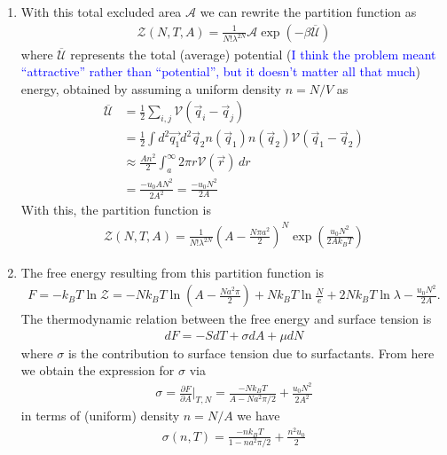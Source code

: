 \documentclass{article}
\theoremstyle{definition}
\newcommand{\p}{\partial}
\newcommand{\be}{\beta}
\newcommand{\f}[2]{\frac{#1}{#2}}
\newcommand{\lp}{\left(}
\newcommand{\rp}{\right)}
\begin{document}
\begin{enumerate}[label=(\alph*)]
	
	\item With this total excluded area $\mathcal{A}$ we can rewrite the partition function as 
	\begin{align*}
	\mathcal{Z}(N,T,A) = \f{1}{N! \lambda^{2N}} \mathcal{A} \exp(-\be \overline{\mathcal{U}})
	\end{align*}
	where $\overline{\mathcal{U}}$ represents the total (average) potential (\textcolor{blue}{I think the problem meant ``attractive'' rather than ``potential'', but it doesn't matter all that much}) energy, obtained by assuming a uniform density $n=N/V$ as
	\begin{align*}
	\overline{\mathcal{U}} &= \f{1}{2} \sum_{i,j} \mathcal{V}(\vec{q}_i - \vec{q}_j) \\
	&= \f{1}{2} \int d^2 \vec{q_1} d^2 \vec{q}_2 n(\vec{q}_1) n(\vec{q}_2) \mathcal{V}(\vec{q}_1 - \vec{q}_2) \\
	&\approx \f{ A n^2}{2} \int_a^\infty  2\pi r   \mathcal{V}(\vec{r})\,dr \\
	&= \f{- u_0 AN^2}{2 A^2} = \boxed{\f{- u_0 N^2}{2A}}
	\end{align*} 
	With this, the partition function is 
	\begin{align*}
	\boxed{\mathcal{Z}(N,T,A) = \f{1}{N! \lambda^{2N}} \lp A - \f{N \pi a^2}{2}\rp^N \exp\lp \f{u_0 N^2}{2A k_BT} \rp}
	\end{align*}
	
	
	\item The free energy resulting from this partition function is 
	\begin{align*}
	F = -k_B T \ln \mathcal{Z} = - N k_BT \ln \lp A - \f{N a^2 \pi}{2} \rp + N k_B T \ln \f{N}{e} + 2N k_B T \ln \lambda - \f{u_0 N^2}{2A}.
	\end{align*}
	The thermodynamic relation between the free energy and surface tension is 
	\begin{align*}
	d F = -S d T + \sigma d A + \mu dN 
	\end{align*}
	where $\sigma$ is the contribution to surface tension due to surfactants. From here we obtain the expression for $\sigma$ via
	\begin{align*}
	\sigma = \f{\p F}{\p A}\bigg\vert_{T,N} = {\f{-N k_BT}{A - N a^2 \pi/2} + \f{u_0 N^2}{2A^2}}
	\end{align*}
	in terms of (uniform) density $n = N/A$ we have
	\begin{align*}
	\boxed{\sigma(n,T) = \f{-n k_B T}{1 - n a^2 \pi/2} + \f{n^2 u_0}{2} }
	\end{align*}
	

\end{enumerate}
\end{document}
